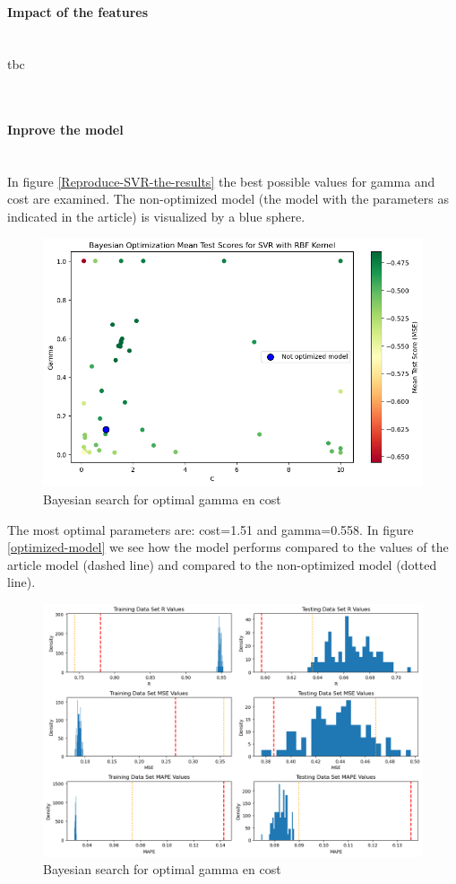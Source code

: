\documentclass{article}
\newcommand{\subsubsubsection}[1]{%
  \paragraph{#1}\mbox{}\\}
\begin{document}
\subsubsubsection{Impact of the features}
tbc


\subsubsubsection{Inprove the model}

In figure \ref{Reproduce-SVR-the-results} the best possible values for gamma and cost are examined. The non-optimized model (the model with the parameters as indicated in the article) is visualized by a blue sphere.
\begin{figure}
    \centering
    \includegraphics[width=\linewidth]{figures/bayesian_optimization.png}
    \caption{Bayesian search for optimal gamma en cost}
    \label{fig:optimized-model}
\end{figure}

The most optimal parameters are: cost=1.51 and gamma=0.558.
In figure \ref{optimized-model} we see how the model performs compared to the values of the article model (dashed line) and compared to the non-optimized model (dotted line).
\begin{figure}
	\centering
	\includegraphics[width=\linewidth]{figures/SVR_optimized_model.png}
	\caption{Bayesian search for optimal gamma en cost}
	\label{fig:one-col-figure}
\end{figure}
\end{document}
